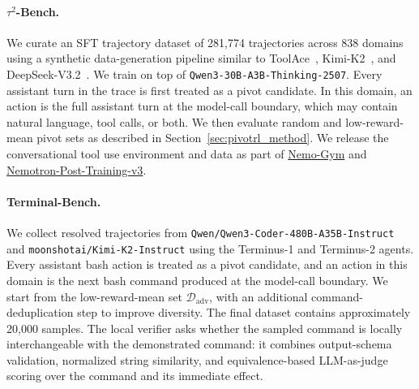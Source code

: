 \paragraph{$\tau^2$-Bench.}
We curate an SFT trajectory dataset of 281{,}774 trajectories across 838 domains using a synthetic data-generation pipeline similar to ToolAce~\citep{liu2025toolacewinningpointsllm}, Kimi-K2~\citep{kimiteam2025kimik2openagentic}, and DeepSeek-V3.2~\citep{deepseekai2025deepseekv32pushingfrontieropen}. We train on top of \texttt{Qwen3-30B-A3B-Thinking-2507}. Every assistant turn in the trace is first treated as a pivot candidate. In this domain, an action is the full assistant turn at the model-call boundary, which may contain natural language, tool calls, or both. We then evaluate random and low-reward-mean pivot sets as described in Section~\ref{sec:pivotrl_method}. We release the conversational tool use environment and data as part of \href{https://github.com/NVIDIA-NeMo/Gym/tree/main/resources_servers/single_step_tool_use_with_argument_comparison}{Nemo-Gym} and \href{https://huggingface.co/datasets/nvidia/Nemotron-RL-Agentic-Conversational-Tool-Use-Pivot-v1}{Nemotron-Post-Training-v3}.

\paragraph{Terminal-Bench.}
We collect resolved trajectories from \texttt{Qwen/Qwen3-Coder-480B-A35B-Instruct} and \texttt{moonshotai/Kimi-K2-Instruct} using the Terminus-1 and Terminus-2 agents. Every assistant bash action is treated as a pivot candidate, and an action in this domain is the next bash command produced at the model-call boundary. We start from the low-reward-mean set $\mathcal{D}_{\mathrm{adv}}$, with an additional command-deduplication step to improve diversity. The final dataset contains approximately 20{,}000 samples. The local verifier asks whether the sampled command is locally interchangeable with the demonstrated command: it combines output-schema validation, normalized string similarity, and equivalence-based LLM-as-judge scoring over the command and its immediate effect.

